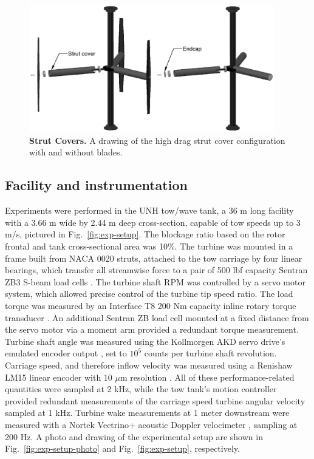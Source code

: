 \documentclass[10pt,letterpaper]{article}
\begin{document}
\begin{figure}[h]
    \includegraphics[width=0.95\textwidth]{figures/strut_covers.eps}
    
    \caption{{\bf Strut Covers.} A drawing of the high drag strut cover
        configuration with and without blades.}
    
    \label{fig:covers}
\end{figure}


\subsection*{Facility and instrumentation}

Experiments were performed in the UNH tow/wave tank, a 36 m long facility with a
3.66 m wide by 2.44 m deep cross-section, capable of tow speeds up to 3 m/s,
pictured in Fig.~\ref{fig:exp-setup}. The blockage ratio based on the rotor
frontal and tank cross-sectional area was 10\%. The turbine was mounted in a
frame built from NACA 0020 struts, attached to the tow carriage by four linear
bearings, which transfer all streamwise force to a pair of 500 lbf capacity
Sentran ZB3 S-beam load cells \cite{SentranZB}. The turbine shaft RPM was
controlled by a servo motor system, which allowed precise control of the turbine
tip speed ratio. The load torque was measured by an Interface T8 200 Nm capacity
inline rotary torque transducer \cite{InterfaceT8}. An additional Sentran ZB
load cell mounted at a fixed distance from the servo motor via a moment arm
provided a redundant torque measurement. Turbine shaft angle was measured using
the Kollmorgen AKD servo drive's emulated encoder output \cite{KollmorgenAKD},
set to $10^5$ counts per turbine shaft revolution. Carriage speed, and therefore
inflow velocity was measured using a Renishaw LM15 linear encoder with 10 $\mu$m
resolution \cite{RenishawLM15}. All of these performance-related quantities were
sampled at 2 kHz, while the tow tank's motion controller provided redundant
measurements of the carriage speed turbine angular velocity sampled at 1 kHz.
Turbine wake measurements at 1 meter downstream were measured with a Nortek
Vectrino+ acoustic Doppler velocimeter \cite{NortekVectrino}, sampling at 200
Hz. A photo and drawing of the experimental setup are shown in
Fig.~\ref{fig:exp-setup-photo} and Fig.~\ref{fig:exp-setup}, respectively.
\end{document}
